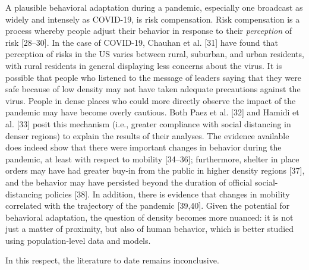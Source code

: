 \documentclass[10pt,letterpaper]{article}
\begin{document}
A plausible behavioral adaptation during a pandemic, especially one
broadcast as widely and intensely as COVID-19, is risk compensation.
Risk compensation is a process whereby people adjust their behavior in
response to their \emph{perception} of risk {[}28--30{]}. In the case of
COVID-19, Chauhan et al. {[}31{]} have found that perception of risks in
the US varies between rural, suburban, and urban residents, with rural
residents in general displaying less concerns about the virus. It is
possible that people who listened to the message of leaders saying that
they were safe because of low density may not have taken adequate
precautions against the virus. People in dense places who could more
directly observe the impact of the pandemic may have become overly
cautious. Both Paez et al. {[}32{]} and Hamidi et al. {[}33{]} posit
this mechanism (i.e., greater compliance with social distancing in
denser regions) to explain the results of their analyses. The evidence
available does indeed show that there were important changes in behavior
during the pandemic, at least with respect to mobility {[}34--36{]};
furthermore, shelter in place orders may have had greater buy-in from
the public in higher density regions {[}37{]}, and the behavior may have
persisted beyond the duration of official social-distancing policies
{[}38{]}. In addition, there is evidence that changes in mobility
correlated with the trajectory of the pandemic {[}39,40{]}. Given the
potential for behavioral adaptation, the question of density becomes
more nuanced: it is not just a matter of proximity, but also of human
behavior, which is better studied using population-level data and
models.

In this respect, the literature to date remains inconclusive.
\end{document}
